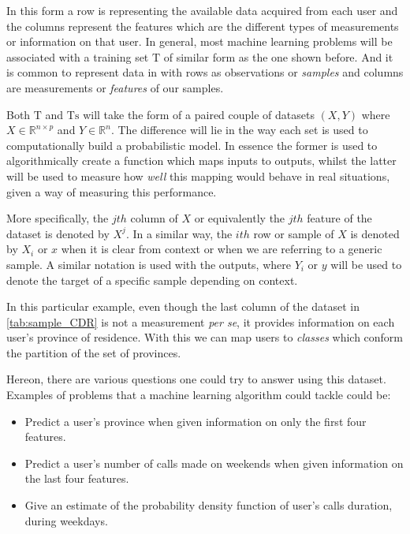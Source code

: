 In this form a row is representing the available data acquired from each user and the columns represent the features which are the different types of measurements or information on that user. In general, most machine learning problems will be associated with a training set $\mathrm{T}$ of similar form as the one shown before. And it is common to represent data in with rows as observations or \textit{samples} and columns are measurements or \textit{features} of our samples.

Both $\mathrm{T}$ and $\mathrm{Ts}$ will take the form of a paired couple of datasets $(X,Y)$ where $X \in \mathbb{R}^{n \times p}$ and $Y \in \mathbb{R}^n $. The difference will lie in the way each set is used to computationally build a probabilistic model. In essence the former is used to algorithmically create a function which maps inputs to outputs,  whilst the latter will be used to measure how \textit{well} this mapping would behave in real situations, given a way of measuring this performance.

More specifically, the $jth$ column of $X$ or equivalently the $jth$ feature of the dataset is denoted by $X^j$. In a similar way, the $ith$ row or sample of $X$ is denoted by $X_i$ or $x$ when it is clear from context or when we are referring to a generic sample. A similar notation is used with the outputs, where $Y_i$ or $y$ will be used to denote the target of a specific sample depending on context.

In this particular example, even though the last column of the dataset in \cref{tab:sample_CDR} is not a measurement \textit{per se}, it provides information on each user's province of residence. With this we can map users to \textit{classes} which conform the partition of the set of provinces.

Hereon, there are various questions one could try to answer using this dataset. Examples of problems that a machine learning algorithm could tackle could be:

\begin{itemize}
\item Predict a user's province when given information on only the first four features.
\item Predict a user's number of calls made on weekends when given information on the last four features.
\item Give an estimate of the probability density function of user's calls duration, during weekdays.
\end{itemize}

